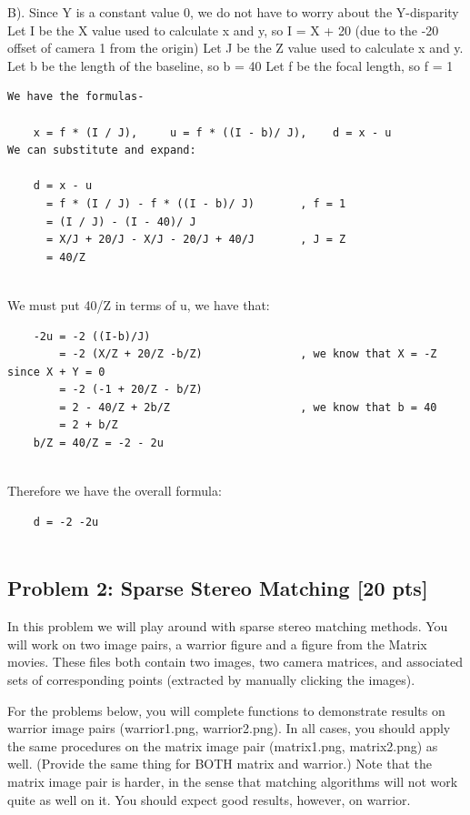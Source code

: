\documentclass[11pt]{article}
\begin{document}
B). Since Y is a constant value 0, we do not have to worry about the
Y-disparity Let I be the X value used to calculate x and y, so I = X +
20 (due to the -20 offset of camera 1 from the origin) Let J be the Z
value used to calculate x and y. Let b be the length of the baseline, so
b = 40 Let f be the focal length, so f = 1

\begin{verbatim}
We have the formulas-

    x = f * (I / J),     u = f * ((I - b)/ J),    d = x - u
We can substitute and expand:

    d = x - u
      = f * (I / J) - f * ((I - b)/ J)       , f = 1
      = (I / J) - (I - 40)/ J
      = X/J + 20/J - X/J - 20/J + 40/J       , J = Z
      = 40/Z
      
\end{verbatim}

We must put 40/Z in terms of u, we have that:

\begin{verbatim}
    -2u = -2 ((I-b)/J)
        = -2 (X/Z + 20/Z -b/Z)               , we know that X = -Z since X + Y = 0
        = -2 (-1 + 20/Z - b/Z)
        = 2 - 40/Z + 2b/Z                    , we know that b = 40
        = 2 + b/Z
    b/Z = 40/Z = -2 - 2u
    
\end{verbatim}

Therefore we have the overall formula:

\begin{verbatim}
    d = -2 -2u
    
\end{verbatim}

    \subsection{Problem 2: Sparse Stereo Matching {[}20
pts{]}}\label{problem-2-sparse-stereo-matching-20-pts}

    In this problem we will play around with sparse stereo matching methods.
You will work on two image pairs, a warrior figure and a figure from the
Matrix movies. These files both contain two images, two camera matrices,
and associated sets of corresponding points (extracted by manually
clicking the images).

For the problems below, you will complete functions to demonstrate
results on warrior image pairs (warrior1.png, warrior2.png). In all
cases, you should apply the same procedures on the matrix image pair
(matrix1.png, matrix2.png) as well. (Provide the same thing for BOTH
matrix and warrior.) Note that the matrix image pair is harder, in the
sense that matching algorithms will not work quite as well on it. You
should expect good results, however, on warrior.
\end{document}
